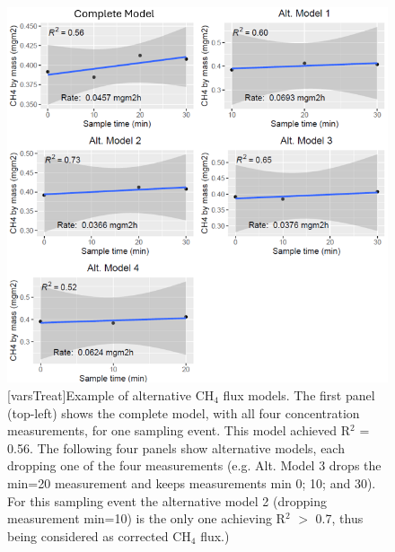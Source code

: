 \begin{figure}[htbp]
\captionsetup{justification=justified}
	\centering 
	\includegraphics[scale=0.8]{Figures/Chapter_1/mod_exp.png}
	[varsTreat]{Example of alternative CH$_{4}$ flux models. The first panel (top-left) shows the complete model, with all four concentration measurements, for one sampling event. This model achieved R$^{2}$ = 0.56. The following four panels show alternative models, each dropping one of the four measurements (e.g. Alt. Model 3 drops the min=20 measurement and keeps measurements min 0; 10; and 30). For this sampling event the alternative model 2 (dropping measurement min=10) is the only one achieving R$^{2}$ $>$ 0.7, thus being considered as corrected CH$_{4}$ flux.)}  
 \label{mod_exp}
\end{figure}


